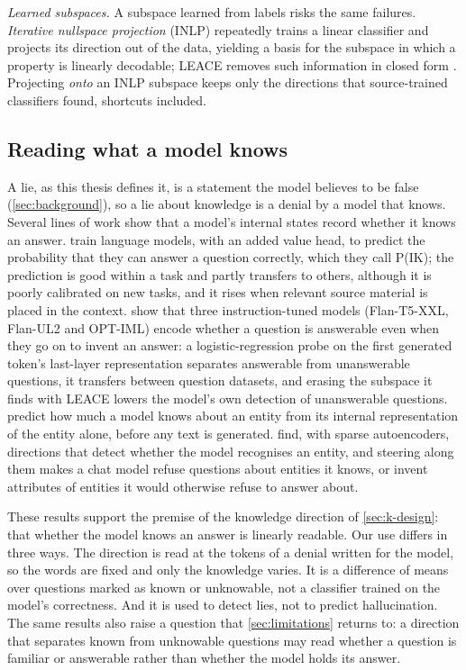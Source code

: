 \emph{Learned subspaces.} A subspace learned from labels risks the same failures. \emph{Iterative
nullspace projection} (INLP) \cite{ravfogel2020null} repeatedly trains a linear classifier and projects
its direction out of the data, yielding a basis for the subspace in which a property is linearly
decodable; LEACE removes such information in closed form \cite{belrose2023leace}. Projecting
\emph{onto} an INLP subspace keeps only the directions that source-trained classifiers found, shortcuts
included.

\subsection{Reading what a model knows}
\label{sec:review-knowledge}

A lie, as this thesis defines it, is a statement the model believes to be false
(\cref{sec:background}), so a lie about knowledge is a denial by a model that knows. Several lines of
work show that a model's internal states record whether it knows an answer.
\textcite{kadavath2022language} train language models, with an added value head, to predict the
probability that they can answer a question correctly, which they call P(IK); the prediction is good
within a task and partly transfers to others, although it is poorly calibrated on new tasks, and it
rises when relevant source material is placed in the context. \textcite{slobodkin2023curious} show
that three instruction-tuned models (Flan-T5-XXL, Flan-UL2 and OPT-IML) encode whether a question is
answerable even when they go on to invent an answer: a logistic-regression probe on the first
generated token's last-layer representation separates answerable from unanswerable questions, it
transfers between question datasets, and erasing the subspace it finds with LEACE
\cite{belrose2023leace} lowers the model's own detection of unanswerable questions.
\textcite{gottesman2024estimating} predict how much a model knows about an entity from its internal
representation of the entity alone, before any text is generated. \textcite{ferrando2025know} find,
with sparse autoencoders, directions that detect whether the model recognises an entity, and steering
along them makes a chat model refuse questions about entities it knows, or invent attributes of
entities it would otherwise refuse to answer about.

These results support the premise of the knowledge direction of \cref{sec:k-design}: that whether the
model knows an answer is linearly readable. Our use differs in three ways. The direction is read at the
tokens of a denial written for the model, so the words are fixed and only the knowledge varies. It is
a difference of means over questions marked as known or unknowable, not a classifier trained on the
model's correctness. And it is used to detect lies, not to predict hallucination. The same results also
raise a question that \cref{sec:limitations} returns to: a direction that separates known from
unknowable questions may read whether a question is familiar or answerable rather than whether the
model holds its answer.

